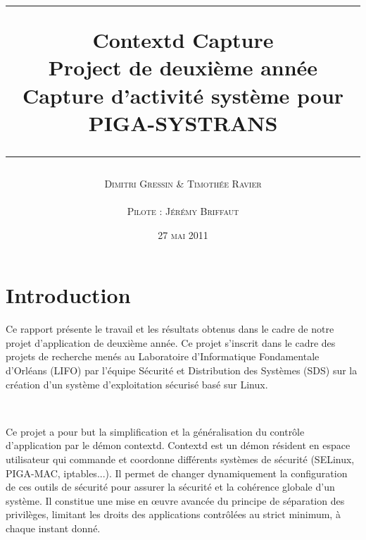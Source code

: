 \documentclass[pdftex,a4paper,titlepage,11pt]{article}
\newcommand{\nom}[1]{\textsc{#1}}
\newcommand{\ligne}[1][1pt]{
  \par\noindent
  \rule[.5ex]{\linewidth}{#1}\par}
\newcommand{\clearemptydoublepage}{
	\newpage{\pagestyle{empty}\cleardoublepage}}
\begin{document}
\setlength{\parskip}{2.4ex}

\title{
\ligne{\Large}
\textbf{Contextd Capture}\\
\textbf{Project de deuxième année}\\
\Large Capture d'activité système pour PIGA-SYSTRANS
\ligne{\Large}
}
\author{\nom{Dimitri Gressin} \& \nom{Timothée Ravier}\\\\\nom{Pilote : Jérémy Briffaut}}
\date{27 \textsc{mai} 2011}

\maketitle

\clearemptydoublepage

\setcounter{secnumdepth}{3}
\setcounter{tocdepth}{2}
\tableofcontents
\addtocounter{page}{-1}

\newpage

\section*{Introduction} 
Ce rapport présente le travail et les résultats obtenus dans le cadre de notre projet d'application de deuxième année. Ce projet s'inscrit dans le cadre des projets de recherche menés au Laboratoire d'Informatique Fondamentale d'Orléans (LIFO) par l'équipe Sécurité et Distribution des Systèmes (SDS) sur la création d'un système d'exploitation sécurisé basé sur Linux.

~

Ce projet a pour but la simplification et la généralisation du contrôle d'application par le démon contextd. Contextd est un démon résident en espace utilisateur qui commande et coordonne différents systèmes de sécurité (SELinux, PIGA-MAC, iptables...). Il permet de changer dynamiquement la configuration de ces outils de sécurité pour assurer la sécurité et la cohérence globale d'un système. Il constitue une mise en œuvre avancée du principe de séparation des privilèges, limitant les droits des applications contrôlées au strict minimum, à chaque instant donné.

~
\end{document}
